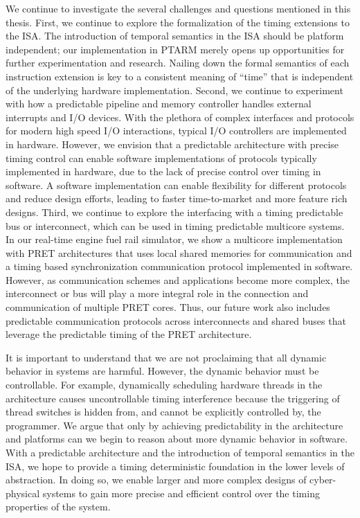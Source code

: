 We continue to investigate the several challenges and questions mentioned in this thesis.
First, we continue to explore the formalization of the timing extensions to the ISA. 
The introduction of temporal semantics in the ISA should be platform independent; our implementation in PTARM merely opens up opportunities for further experimentation and research. 
Nailing down the formal semantics of each instruction extension is key to a consistent meaning of ``time'' that is independent of the underlying hardware implementation. 
Second, we continue to experiment with how a predictable pipeline and memory controller handles external interrupts and I/O devices.     
With the plethora of complex interfaces and protocols for modern high speed I/O interactions, typical I/O controllers are implemented in hardware.
However, we envision that a predictable architecture with precise timing control can enable software implementations of protocols typically implemented in hardware, due to the lack of precise control over timing in software.
A software implementation can enable flexibility for different protocols and reduce design efforts, leading to faster time-to-market and more feature rich designs.        
Third, we continue to explore the interfacing with a timing predictable bus or interconnect, which can be used in timing predictable multicore systems.
In our real-time engine fuel rail simulator, we show a multicore implementation with PRET architectures that uses local shared memories for communication and  a timing based synchronization communication protocol implemented in software.  
However, as communication schemes and applications become more complex, the interconnect or bus will play a more integral role in the connection and communication of multiple PRET cores.
Thus, our future work also includes predictable communication protocols across interconnects and shared buses that leverage the predictable timing of the PRET architecture.     

It is important to understand that we are not proclaiming that all dynamic behavior in systems are harmful.
However, the dynamic behavior must be controllable. 
For example, dynamically scheduling hardware threads in the architecture causes uncontrollable timing interference because the triggering of thread switches is hidden from, and cannot be explicitly controlled by, the programmer.
We argue that only by achieving predictability in the architecture and platforms can we begin to reason about more dynamic behavior in software.
With a predictable architecture and the introduction of temporal semantics in the ISA, we hope to provide a timing deterministic foundation in the lower levels of abstraction.
In doing so, we enable larger and more complex designs of cyber-physical systems to gain more precise and efficient control over the timing properties of the system.  

